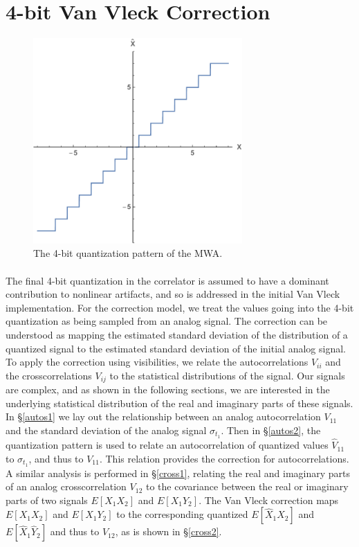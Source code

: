 \documentclass[11pt]{article}
\begin{document}
\section{4-bit Van Vleck Correction}
\begin{figure}
\centering{}
\includegraphics[width=80mm]{quant.pdf}
\caption{The 4-bit quantization pattern of the MWA.\label{quant}}
\end{figure}

\paragraph{}
The final 4-bit quantization in the correlator is assumed to have a dominant contribution to nonlinear artifacts, and so is addressed in the initial Van Vleck implementation. For the correction model, we treat the values going into the 4-bit quantization as being sampled from an analog signal. The correction can be understood as mapping the estimated standard deviation of the distribution of a quantized signal to the estimated standard deviation of the initial analog signal. To apply the correction using visibilities, we relate the autocorrelations $V_{ii}$ and the crosscorrelations $V_{ij}$ to the statistical distributions of the signal. Our signals are complex, and as shown in the following sections, we are interested in the underlying statistical distribution of the real and imaginary parts of these signals. In \S \ref{autos1} we lay out the relationship between an analog autocorrelation $V_{11}$ and the standard deviation of the analog signal $\sigma_{t_1}$. Then in \S \ref{autos2}, the quantization pattern is used to relate an autocorrelation of quantized values $\hat V_{11}$ to $\sigma_{t_1}$, and thus to $V_{11}$. This relation provides the correction for autocorrelations. A similar analysis is performed in \S \ref{cross1}, relating the real and imaginary parts of an analog crosscorrelation $V_{12}$ to the covariance between the real or imaginary parts of two signals $E[X_1X_2]$ and $E[X_1Y_2]$. The Van Vleck correction maps $E[X_1X_2]$ and $E[X_1Y_2]$ to the corresponding quantized $E[\hat X_1\hat X_2]$ and $ E[\hat X_1\hat Y_2]$ and thus to $\hat V_{12}$, as is shown in  \S \ref{cross2}.
\end{document}
